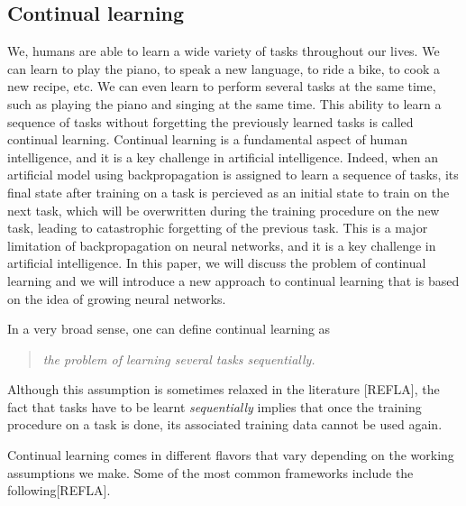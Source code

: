 \documentclass[11pt]{article}
\begin{document}
\subsection{Continual learning}


We, humans are able to learn a wide variety of tasks throughout our lives. We can learn to play the piano, to speak a new language, to ride a bike, to cook a new recipe, etc. We can even learn to perform several tasks at the same time, such as playing the piano and singing at the same time. This ability to learn a sequence of tasks without forgetting the previously learned tasks is called continual learning. Continual learning is a fundamental aspect of human intelligence, and it is a key challenge in artificial intelligence. Indeed, when an artificial model using backpropagation is assigned to learn a sequence of tasks, its final state after training on a task is percieved as an initial state to train on the next task, which will be overwritten during the training procedure on the new task, leading to catastrophic forgetting of the previous task. This is a major limitation of backpropagation on neural networks, and it is a key challenge in artificial intelligence. In this paper, we will discuss the problem of continual learning and we will introduce a new approach to continual learning that is based on the idea of growing neural networks.

\vspace{2mm}
\noindent
In a very broad sense, one can define continual learning as

\begin{quote}
    \itshape
    \centering
    the problem of learning several tasks sequentially.
\end{quote}
Although this assumption is sometimes relaxed in the literature [REFLA], the fact that tasks have to be learnt \textit{sequentially} implies that once the training procedure on a task is done, its associated training data cannot be used again. 

\vspace{2mm}
\noindent
Continual learning comes in different flavors that vary depending on the working assumptions we make. Some of the most common frameworks include the following[REFLA].
\end{document}
